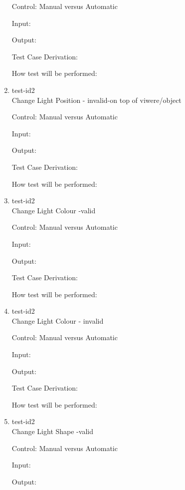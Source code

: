 \documentclass[12pt, titlepage]{article}
\begin{document}
\begin{enumerate}
	Control: Manual versus Automatic
	
	Input: 
	
	Output: 
	
	Test Case Derivation: 
	
	How test will be performed: 

	\item{test-id2\\}Change Light Position - invalid-on top of viwere/object
	
	Control: Manual versus Automatic
	
	Input: 
	
	Output: 
	
	Test Case Derivation: 
	
	How test will be performed: 

	\item{test-id2\\}Change Light Colour -valid
	
	Control: Manual versus Automatic
	
	Input: 
	
	Output: 
	
	Test Case Derivation: 
	
	How test will be performed: 
	
	\item{test-id2\\}Change Light Colour - invalid
	
	Control: Manual versus Automatic
	
	Input: 
	
	Output: 
	
	Test Case Derivation: 
	
	How test will be performed: 
	
	\item{test-id2\\}Change Light Shape -valid
	
	Control: Manual versus Automatic
	
	Input: 
	
	Output: 
	

\end{enumerate}
\end{document}
